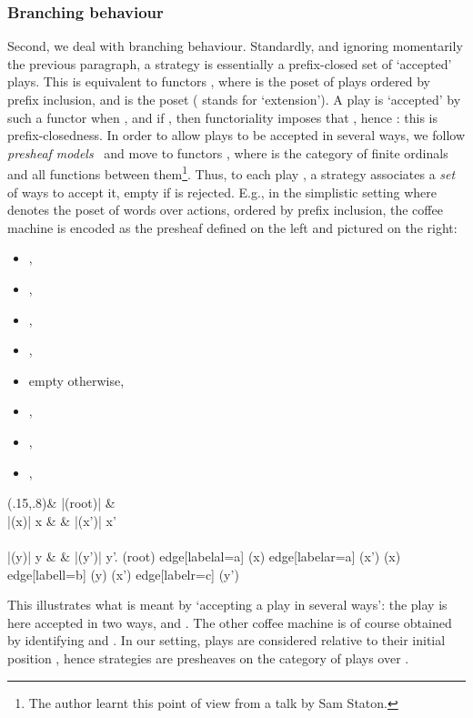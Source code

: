 \documentclass{LMCS}
\theoremstyle{plain}\newtheorem{satz}[thm]{Satz}
\begin{document}
\subsubsection*{Branching behaviour}
Second, we deal with 
branching behaviour. Standardly, and ignoring momentarily the previous
paragraph, a strategy is essentially a prefix-closed set of `accepted'
plays.  This is equivalent to functors , where
 is the poset of plays ordered by prefix inclusion, and  is
the poset  ( stands for `extension').  A play
 is `accepted' by such a functor  when ,
and if , then functoriality imposes that
, hence : this is
prefix-closedness.  In order to allow plays to be accepted in several
ways, we follow \emph{presheaf models}~\cite{DBLP:conf/lics/JoyalNW93}
and move to functors , where  is the
category of finite ordinals and all functions between
them\footnote{The author learnt this point of view from a talk by Sam
  Staton.}. Thus, to each play , a strategy
associates a \emph{set} of ways to accept it, empty if  is
rejected.  E.g., in the simplistic setting where  denotes the
poset of words over actions, ordered by prefix inclusion, the coffee
machine  is encoded as the presheaf  defined on the left
and pictured on the right:
\begin{center}
    \begin{minipage}[c]{0.26\linewidth}
      \begin{itemize}
      \item ,
      \item ,
      \item ,
      \item ,
      \end{itemize}
    \end{minipage}
      \hfil
    \begin{minipage}[c]{0.44\linewidth}
      \begin{itemize}
      \item  empty otherwise,
      \item ,
      \item ,
      \item ,
      \end{itemize}
    \end{minipage}
      \hfil
      \begin{minipage}[c]{0.28\linewidth}
        \vspace*{-.8em}
        \diag(.15,.8){\& |(root)| \star \& \\
          |(x)| x \& \& |(x')| x' \\
          \\
          |(y)| y \& \& |(y')| y'. }{(root) edge[labelal={a}] (x) edge[labelar={a}] (x') (x) edge[labell={b}] (y) (x') edge[labelr={c}] (y') }
      \end{minipage}
\end{center}
This illustrates what is meant by `accepting a play in several ways':
the play  is here accepted in two ways,  and .  The other
coffee machine is of course obtained by identifying  and . In
our setting, plays are considered relative to their initial position
, hence strategies are presheaves  on the
category of plays over .
\end{document}
